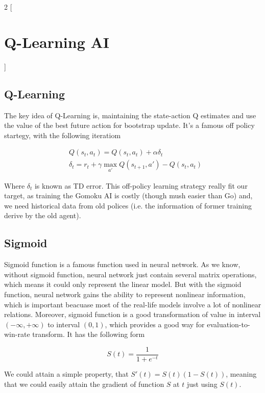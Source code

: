\documentclass[a4paper, 12pt]{article} %
\begin{document}
	\begin{multicols}{2}
		[
		\section{Q-Learning AI}
		]
		\subsection{Q-Learning}
		
		The key idea of Q-Learning is, maintaining the state-action Q estimates and use the value of the best future action for bootstrap update. It's a famous off policy startegy, with the following iteratiom
		
		\begin{equation*}
			\begin{split}
				& Q(s_t, a_t)  = Q(s_t, a_t) + \alpha \delta_t \\
				& \delta_t  = r_t + \gamma \max\limits_{a'}Q(s_{t + 1}, a') - Q(s_t, a_t)
			\end{split}
		\end{equation*}
	
		Where $\delta_t$ is known as TD error. This off-policy learning strategy really fit our target, as training the Gomoku AI is costly (though mush easier than Go) and, we need historical data from old polices (i.e. the information of former training derive by the old agent).
		
		\subsection{Sigmoid}
		
		Sigmoid function is a famous function used in neural network. As we know, without sigmoid function, neural network just contain several matrix operations, which means it could only represent the linear model. But with the sigmoid function, neural network gains the ability to represent nonlinear information, which is important beacuase most of the real-life models involve a lot of nonlinear relations. Moreover, sigmoid function is a good transformation of value in interval $(-\infty, +\infty)$ to interval $(0, 1)$, which provides a good way for evaluation-to-win-rate transform. It has the following form
		
		
		\begin{equation*}
			S(t) = \frac{1}{1 + e^{-t}}
		\end{equation*}
	
		We could attain a simple property, that $S'(t) = S(t)(1 - S(t))$, meaning that we could easily attain the gradient of function $S$ at $t$ just using $S(t)$.
		

\end{multicols}
\end{document}
